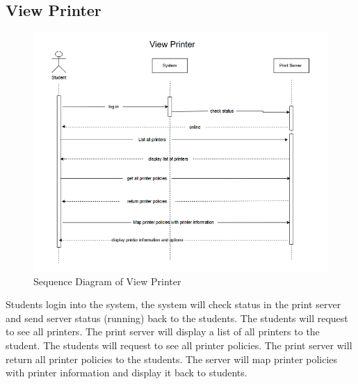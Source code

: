 \subsection{View Printer}                                                                        
\begin{figure}[H]
\centering
  \includegraphics[max width=0.9\linewidth,origin = c]{chapters/4. system-modeling/picture/ViewPrinter.png}
  \caption{Sequence Diagram of View Printer}%
\end{figure}
Students login into the system, the system will check status in the print server and send server status (running) back to the students. The students will request to see all printers. The print server will display a list of all printers to the student. The students will request to see all printer policies. The print server will return all printer policies to the students. The server will map printer policies with printer information and display it back to students.
